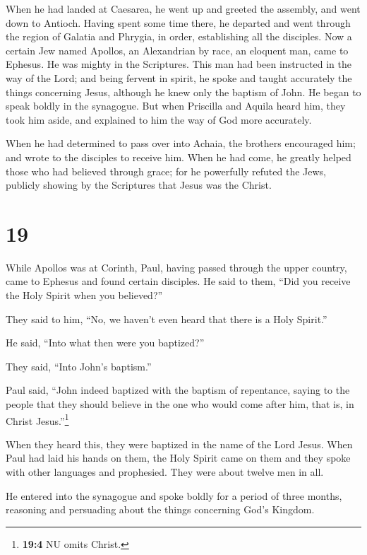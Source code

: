  When he had landed at Caesarea, he went up and greeted
the assembly, and went down to Antioch.  Having spent
some time there, he departed and went through the region of Galatia and
Phrygia, in order, establishing all the disciples.  Now a
certain Jew named Apollos, an Alexandrian by race, an eloquent man, came
to Ephesus. He was mighty in the Scriptures.  This man
had been instructed in the way of the Lord; and being fervent in spirit,
he spoke and taught accurately the things concerning Jesus, although he
knew only the baptism of John.  He began to speak boldly
in the synagogue. But when Priscilla and Aquila heard him, they took him
aside, and explained to him the way of God more accurately.

 When he had determined to pass over into Achaia, the
brothers encouraged him; and wrote to the disciples to receive him. When
he had come, he greatly helped those who had believed through grace;
 for he powerfully refuted the Jews, publicly showing by
the Scriptures that Jesus was the Christ.

\hypertarget{section-18}{%
\section{19}\label{section-18}}

 While Apollos was at Corinth, Paul, having passed through
the upper country, came to Ephesus and found certain disciples.
 He said to them, ``Did you receive the Holy Spirit when
you believed?''

They said to him, ``No, we haven't even heard that there is a Holy
Spirit.''

 He said, ``Into what then were you baptized?''

They said, ``Into John's baptism.''

 Paul said, ``John indeed baptized with the baptism of
repentance, saying to the people that they should believe in the one who
would come after him, that is, in Christ Jesus.''\footnote{\textbf{19:4}
  NU omits Christ.}

 When they heard this, they were baptized in the name of
the Lord Jesus.  When Paul had laid his hands on them, the
Holy Spirit came on them and they spoke with other languages and
prophesied.  They were about twelve men in all.

 He entered into the synagogue and spoke boldly for a
period of three months, reasoning and persuading about the things
concerning God's Kingdom.

